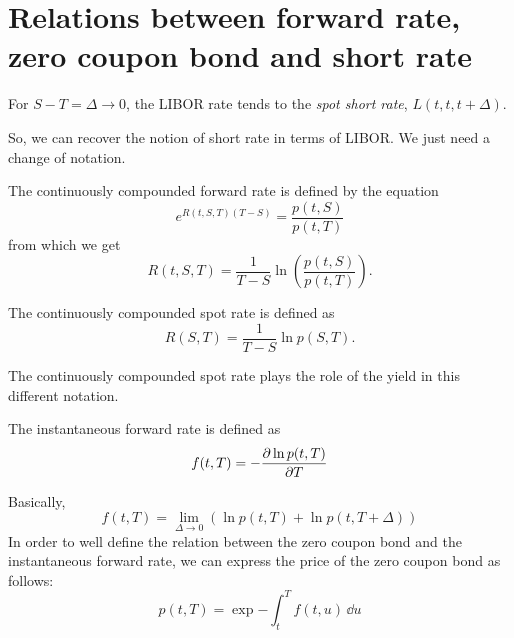 \section[Relations between \texorpdfstring{$f(t,T)$}{f(t,T)}, \texorpdfstring{$p(t,T)$}{p(t,T)} and \texorpdfstring{$r(t)$}{r(t)}]{Relations between forward rate, zero coupon bond and short rate}
\begin{remark} %
    For $S-T=\Delta\to 0$, the LIBOR rate tends to the \emph{spot short rate}, $L(t,t,t+\Delta)$.
\end{remark}
So, we can recover the notion of short rate in terms of LIBOR. We just need a change of notation.
\begin{definition}
    The continuously compounded forward rate is defined by the equation
    \begin{equation}
        e^{R(t,S,T)(T-S)} = \frac{p(t,S)}{p(t,T)}
    \end{equation}
    from which we get
    \begin{equation}
        R(t,S,T) = \frac{1}{T-S}\ln\left(\frac{p(t,S)}{p(t,T)}\right).
    \end{equation}
\end{definition}
\begin{definition}
    The continuously compounded spot rate is defined as
    \begin{equation}
        R(S,T) = \frac{1}{T-S}\ln p(S,T).
    \end{equation}
\end{definition}
The continuously compounded spot rate plays the role of the yield in this different notation.
\begin{definition}
    The instantaneous forward rate is defined as
    \begin{equation}\label{forwrate}
        f(t,T) = -\pdv{\ln p(t,T)}{T}
    \end{equation}
\end{definition}
Basically,
\begin{equation}
    f(t,T) = \lim_{\Delta \to 0} (\ln p(t,T) + \ln p(t, T+\Delta))
\end{equation}
In order to well define the relation between the zero coupon bond and the instantaneous forward rate, we can express the price of the zero coupon bond as follows:
\begin{equation}
    p(t,T) = \exp{-\int_t^T f(t,u)\,\dd u}
\end{equation}
